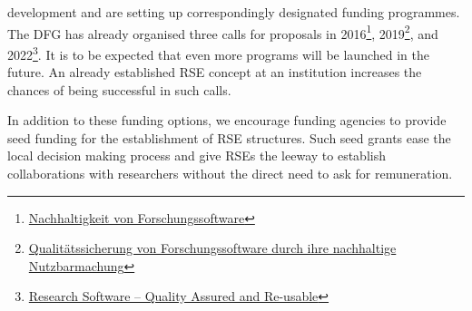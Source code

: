 \documentclass[a4paper]{article}
\begin{document}
\begin{enumerate}
      development and are setting up correspondingly designated funding programmes.
      The DFG has already organised three calls for proposals in 2016\footnote{\href{https://www.dfg.de/resource/blob/172674/1bcb181a6451fdac9d94421776b52798/161026-dfg-ausschreibung-forschungssoftware-de-data.pdf}{Nachhaltigkeit von Forschungssoftware}}, 2019\footnote{\href{https://www.dfg.de/de/aktuelles/neuigkeiten-themen/info-wissenschaft/2019/info-wissenschaft-19-44}{Qualitätssicherung von Forschungssoftware durch ihre nachhaltige Nutzbarmachung}}, and 2022\footnote{\href{https://www.dfg.de/en/news/news-topics/announcements-proposals/2022/info-wissenschaft-22-85}{Research Software – Quality Assured and Re-usable}}\autocite{katerbow_dfg_rse_funding_2018}.
      It is to be expected that even more programs will be launched in the future.
      An already established RSE concept at an institution increases the chances of being successful in such calls.
\end{enumerate}

In addition to these funding options, we encourage funding agencies to provide seed funding for the establishment of RSE structures.
Such seed grants ease the local decision making process and give RSEs the leeway to establish collaborations with researchers without the direct need to ask for remuneration.

\end{document}
